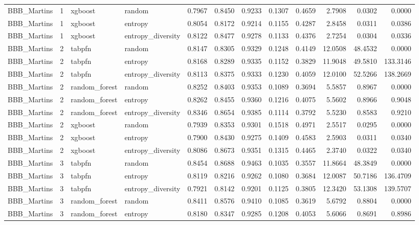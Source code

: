 \begin{tabular}{lrllrrrrrrrr}
BBB_Martins & 1 & xgboost & random & 0.7967 & 0.8450 & 0.9233 & 0.1307 & 0.4659 & 2.7908 & 0.0302 & 0.0000 \\
BBB_Martins & 1 & xgboost & entropy & 0.8054 & 0.8172 & 0.9214 & 0.1155 & 0.4287 & 2.8458 & 0.0311 & 0.0386 \\
BBB_Martins & 1 & xgboost & entropy_diversity & 0.8122 & 0.8477 & 0.9278 & 0.1133 & 0.4376 & 2.7254 & 0.0304 & 0.0336 \\
BBB_Martins & 2 & tabpfn & random & 0.8147 & 0.8305 & 0.9329 & 0.1248 & 0.4149 & 12.0508 & 48.4532 & 0.0000 \\
BBB_Martins & 2 & tabpfn & entropy & 0.8168 & 0.8289 & 0.9335 & 0.1152 & 0.3829 & 11.9048 & 49.5810 & 133.3146 \\
BBB_Martins & 2 & tabpfn & entropy_diversity & 0.8113 & 0.8375 & 0.9333 & 0.1230 & 0.4059 & 12.0100 & 52.5266 & 138.2669 \\
BBB_Martins & 2 & random_forest & random & 0.8252 & 0.8403 & 0.9353 & 0.1089 & 0.3694 & 5.5857 & 0.8967 & 0.0000 \\
BBB_Martins & 2 & random_forest & entropy & 0.8262 & 0.8455 & 0.9360 & 0.1216 & 0.4075 & 5.5602 & 0.8966 & 0.9048 \\
BBB_Martins & 2 & random_forest & entropy_diversity & 0.8346 & 0.8654 & 0.9385 & 0.1114 & 0.3792 & 5.5230 & 0.8583 & 0.9210 \\
BBB_Martins & 2 & xgboost & random & 0.7939 & 0.8353 & 0.9301 & 0.1518 & 0.4971 & 2.5517 & 0.0295 & 0.0000 \\
BBB_Martins & 2 & xgboost & entropy & 0.7900 & 0.8430 & 0.9275 & 0.1409 & 0.4583 & 2.5903 & 0.0311 & 0.0340 \\
BBB_Martins & 2 & xgboost & entropy_diversity & 0.8086 & 0.8673 & 0.9351 & 0.1315 & 0.4465 & 2.3740 & 0.0322 & 0.0340 \\
BBB_Martins & 3 & tabpfn & random & 0.8454 & 0.8688 & 0.9463 & 0.1035 & 0.3557 & 11.8664 & 48.3849 & 0.0000 \\
BBB_Martins & 3 & tabpfn & entropy & 0.8119 & 0.8216 & 0.9262 & 0.1080 & 0.3684 & 12.0087 & 50.7186 & 136.4709 \\
BBB_Martins & 3 & tabpfn & entropy_diversity & 0.7921 & 0.8142 & 0.9201 & 0.1125 & 0.3805 & 12.3420 & 53.1308 & 139.5707 \\
BBB_Martins & 3 & random_forest & random & 0.8411 & 0.8576 & 0.9410 & 0.1085 & 0.3619 & 5.6792 & 0.8804 & 0.0000 \\
BBB_Martins & 3 & random_forest & entropy & 0.8180 & 0.8347 & 0.9285 & 0.1208 & 0.4053 & 5.6066 & 0.8691 & 0.8986 \\

\end{tabular}
